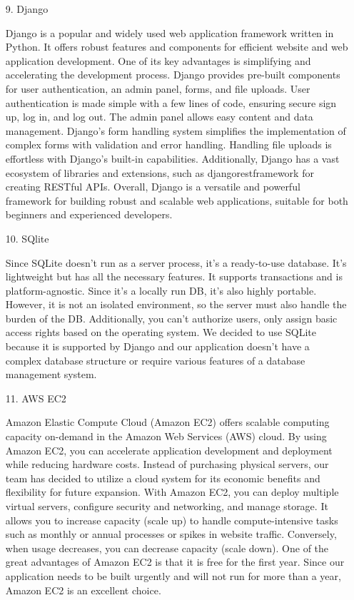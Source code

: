 \documentclass[conference, a4paper]{IEEEtran}
\begin{document}
\begin{enumerate}
\begin{enumerate}
        \item[9.]Django \cite{djangogirlstutorial}
        \item[]Django is a popular and widely used web application framework written in Python. It offers robust features and components for efficient website and web application development. One of its key advantages is simplifying and accelerating the development process. Django provides pre-built components for user authentication, an admin panel, forms, and file uploads. User authentication is made simple with a few lines of code, ensuring secure sign up, log in, and log out. The admin panel allows easy content and data management. Django's form handling system simplifies the implementation of complex forms with validation and error handling. Handling file uploads is effortless with Django's built-in capabilities. Additionally, Django has a vast ecosystem of libraries and extensions, such as djangorestframework for creating RESTful APIs. Overall, Django is a versatile and powerful framework for building robust and scalable web applications, suitable for both beginners and experienced developers.\\


        \item[10.]SQlite \cite{velog-django-tutorial}
        \item[]Since SQLite doesn't run as a server process, it's a ready-to-use database. It's lightweight but has all the necessary features. It supports transactions and is platform-agnostic. Since it's a locally run DB, it's also highly portable. However, it is not an isolated environment, so the server must also handle the burden of the DB. Additionally, you can't authorize users, only assign basic access rights based on the operating system. We decided to use SQLite because it is supported by Django and our application doesn't have a complex database structure or require various features of a database management system.\\

        \item[11.]AWS EC2 \cite{aws-ec2-docs}
        \item[]Amazon Elastic Compute Cloud (Amazon EC2) offers scalable computing capacity on-demand in the Amazon Web Services (AWS) cloud. By using Amazon EC2, you can accelerate application development and deployment while reducing hardware costs. Instead of purchasing physical servers, our team has decided to utilize a cloud system for its economic benefits and flexibility for future expansion. With Amazon EC2, you can deploy multiple virtual servers, configure security and networking, and manage storage. It allows you to increase capacity (scale up) to handle compute-intensive tasks such as monthly or annual processes or spikes in website traffic. Conversely, when usage decreases, you can decrease capacity (scale down). One of the great advantages of Amazon EC2 is that it is free for the first year. Since our application needs to be built urgently and will not run for more than a year, Amazon EC2 is an excellent choice.\\


\end{enumerate}
\end{enumerate}
\end{document}
